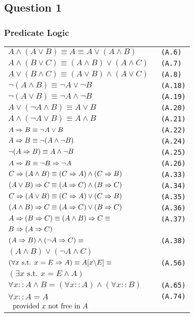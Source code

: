 \subsection{Question 1}

\subsubsection{Predicate Logic}
\setlength{\tabcolsep}{0pt} 
\begin{tabular}{@{}ll@{}}
$ A \land (A \lor B) \equiv A \equiv A \lor (A \land B)$ & \verb! (A.6)! \\
$ A \land (B \lor C) \equiv (A \land B) \lor (A \land C)$ & \verb! (A.7)! \\
$ A \lor (B \land C) \equiv (A \lor B) \land (A \lor C)$ & \verb! (A.8)! \\
$ \neg (A \land B) \equiv \neg A \lor \neg B$ & \verb! (A.18)! \\
$ \neg (A \lor B) \equiv \neg A \land \neg B$ & \verb! (A.19)! \\
$ A \lor (\neg A \land B) \equiv A \lor B$ & \verb! (A.20)! \\
$ A \land (\neg A \lor B) \equiv A \land B$ & \verb! (A.21)! \\
$ A \Rightarrow B \equiv \neg A \lor B$ & \verb! (A.22)! \\
$ A \Rightarrow B \equiv \neg(A \land \neg B)$ & \verb! (A.24)! \\
$ \neg(A \Rightarrow B) \equiv A \land \neg B$ & \verb! (A.25)! \\
$ A \Rightarrow B \equiv \neg B \Rightarrow \neg A$ & \verb! (A.26)! \\
$ C \Rightarrow (A \land B) \equiv (C \Rightarrow A) \land (C \Rightarrow B)$ & \verb! (A.33)! \\
$ (A \lor B) \Rightarrow C \equiv (A \Rightarrow C) \land (B \Rightarrow C)$ & \verb! (A.34)! \\
$ C \Rightarrow (A \lor B) \equiv (C \Rightarrow A) \lor (C \Rightarrow B)$ & \verb! (A.35)! \\
$ (A \land B) \Rightarrow C \equiv (A \Rightarrow C) \lor (B \Rightarrow C)$ & \verb! (A.36)! \\
$ A \Rightarrow (B \Rightarrow C) \equiv (A \land B) \Rightarrow C \equiv$ & \verb! (A.37)! \\
$ B \Rightarrow (A \Rightarrow C)$ & \\
$ (A \Rightarrow B) \land (\neg A \Rightarrow C) \equiv$ & \verb! (A.38)! \\
$ (A \land B) \lor (\neg A \land C)$ & \\
$ (\forall x \text{ s.t. } x = E \Rightarrow A) \equiv A[x \backslash E] \equiv $ & \verb! (A.56)! \\
$ (\exists x \text{ s.t. } x = E \land A)$ & \\
$ \forall x :: A \land B = (\forall x :: A) \land (\forall x :: B)$ & \verb! (A.65)! \\
$ \forall x :: A = A$ & \verb! (A.74)! \\
$ \hspace*{0.1cm} \text{ provided } x \text{ not free in } A$ & \\
\end{tabular}

